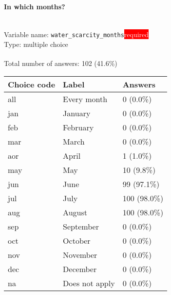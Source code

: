 \documentclass[11.5pt, a4paper]{scrartcl}
\begin{document}
\paragraph{In which months?}
\  \\Variable name: \texttt{water\_scarcity\_months}\hfill\colorbox{red}{\small{\textcolor{white}{required}}}\\
 Type: multiple choice\\
\\Total number of answers: 102 (41.6\%)
\\[0.2em] \begin{tabular}{p{4cm}|p{8cm}|p{3cm}}
Choice code & Label & Answers \\
\hline
all & Every month& \cellcolor{color0}0 (0.0\%)\\
\cellcolor{mygray} jan & \cellcolor{mygray}January & \cellcolor{color0}0 (0.0\%)\\
feb & February& \cellcolor{color0}0 (0.0\%)\\
\cellcolor{mygray} mar & \cellcolor{mygray}March & \cellcolor{color0}0 (0.0\%)\\
aor & April& \cellcolor{color0}1 (1.0\%)\\
\cellcolor{mygray} may & \cellcolor{mygray}May & \cellcolor{color0}10 (9.8\%)\\
jun & June& \cellcolor{color4}99 (97.1\%)\\
\cellcolor{mygray} jul & \cellcolor{mygray}July & \cellcolor{color4}100 (98.0\%)\\
aug & August& \cellcolor{color4}100 (98.0\%)\\
\cellcolor{mygray} sep  & \cellcolor{mygray}September & \cellcolor{color0}0 (0.0\%)\\
oct  & October& \cellcolor{color0}0 (0.0\%)\\
\cellcolor{mygray} nov & \cellcolor{mygray}November & \cellcolor{color0}0 (0.0\%)\\
dec  & December& \cellcolor{color0}0 (0.0\%)\\
\cellcolor{mygray} na & \cellcolor{mygray}Does not apply & \cellcolor{color0}0 (0.0\%)\\
\end{tabular}
\end{document}
